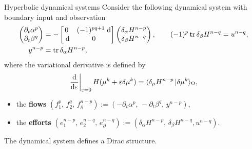 \documentclass[aspectratio=169]{beamer}
\DeclareMathOperator{\tr}{tr}
\newcommand{\dualpr}[3][]{\ensuremath{\langle #2 \, \vert #3 \rangle_{#1}}}
\begin{document}
\begin{frame}{Hyperbolic dynamical systems}
	Consider the following dynamical system with boundary input and observation
	\begin{equation*}
	\begin{aligned}
		\begin{pmatrix}
			\partial_t \alpha^p \\
			\partial_t \beta^q\\
		\end{pmatrix} &= 
		-\begin{bmatrix}
			0 & (-1)^{pq+1}\d \\
			\d & 0 \\
		\end{bmatrix}
		\begin{pmatrix}
			\delta_{\alpha} H^{n-p}\\
			\delta_{\beta} H^{n-q}\\
		\end{pmatrix}, \qquad (-1)^p\tr \delta_{\beta} H^{n-q} = u^{n-q}, \\
		y^{n-p} &= \tr \delta_{\alpha} H^{n-p}, 
	\end{aligned}	
	\end{equation*}
where the variational derivative is defined by
\begin{equation*}
	\begin{aligned}
		\left.\diff{}{\varepsilon}\right|_{\varepsilon = 0} H({\mu}^k + \varepsilon \delta {\mu}^k) = \dualpr[\Omega]{\delta_{\mu} H^{n-p}}{\delta {\mu}^k},
	\end{aligned}
\end{equation*}
\begin{itemize}
	\item
	the \textbf{flows} $({f}_1^p,\, f_2^q,\, {f}_{\partial}^{n-p}) := (-\partial_t \alpha^p,\,  -\partial_t \beta^q, \, {y}^{n-p}),$
	\item
	the \textbf{efforts} $(e_1^{n-p}, \, e_2^{n-q}, \, {e}_{\partial}^{n-q}) := ( \delta_{\alpha} H^{n-p}, \,  \delta_{\beta} H^{n-q}, {u}^{n-q}).$
\end{itemize}
The dynamical system defines a Dirac structure.

\end{frame}
\end{document}
